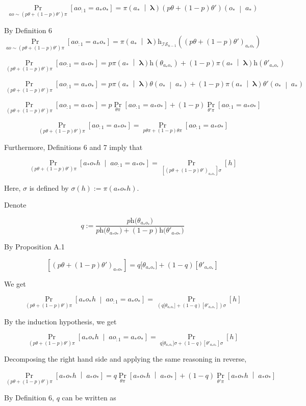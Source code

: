 \documentclass[a4paper]{article}
\newcommand{\AP}[1]{\left(#1\right)}
\newcommand{\AB}[1]{\left[#1\right]}
\newcommand{\APM}[2]{\left(#1\;\middle\vert\;#2\right)}
\newcommand{\ABM}[2]{\left[#1\;\middle\vert\;#2\right]}
\newcommand{\Pa}[2]{\underset{#1}{\operatorname{Pr}}\AB{#2}}
\newcommand{\CP}[3]{\underset{#1}{\operatorname{Pr}}\ABM{#2}{#3}}
\newcommand{\Estr}{\boldsymbol{\lambda}} %
\newcommand{\Ht}{\mathrm{h}}
\newcommand{\IS}{\mathcal{IS}}
\begin{document}
$$\Pa{ao\sim\AP{p\theta+(1-p)\theta'}\pi}{ao_{:1}=a_*o_*}=\pi\APM{a_*}{\Estr}\AP{p\theta+(1-p)\theta'}\APM{o_*}{ a_*}$$

By Definition 6
$$\Pa{ao\sim\AP{p\theta+(1-p)\theta'}\pi}{ao_{:1}=a_*o_*}=\pi\APM{a_*}{\Estr}\Ht_{\IS_{n-1}}\AP{\AP{p\theta+(1-p)\theta'}_{a_*o_*}}$$

$$\Pa{\AP{p\theta+(1-p)\theta'}\pi}{ao_{:1}=a_*o_*}=p\pi\APM{a_*}{\Estr}\Ht\AP{\theta_{a_*o_*}}+(1-p)\pi\APM{a_*}{\Estr}\Ht\AP{\theta'_{a_*o_*}}$$

$$\Pa{\AP{p\theta+(1-p)\theta'}\pi}{ao_{:1}=a_*o_*}=p\pi\APM{a_*}{\Estr}\theta\APM{o_*}{a_*}+(1-p)\pi\APM{a_*}{\Estr}\theta'\APM{o_*}{a_*}$$

$$\Pa{\AP{p\theta+(1-p)\theta'}\pi}{ao_{:1}=a_*o_*}=p\Pa{\theta\pi}{ao_{:1}=a_*o_*}+(1-p)\Pa{\theta'\pi}{ao_{:1}=a_*o_*}$$

$$\Pa{\AP{p\theta+(1-p)\theta'}\pi}{ao_{:1}=a_*o_*}=\Pa{p\theta\pi+(1-p)\theta\pi}{ao_{:1}=a_*o_*}$$

Furthermore, Definitions 6 and 7 imply that

$$\CP{\AP{p\theta+(1-p)\theta'}\pi}{a_*o_*h}{ao_{:1}=a_*o_*}=\Pa{\AB{\AP{p\theta+(1-p)\theta'}_{a_*o_*}}\sigma}{h}$$

Here, $\sigma$ is defined by $\sigma(h):=\pi\AP{a_*o_*h}$. 

Denote

$$q:=\frac{p\Ht\big(\theta_{a_*o_*}\big)}{p\Ht\big(\theta_{a_*o_*}\big)+(1-p)\Ht\big(\theta'_{a_*o_*}\big)}$$

By Proposition A.1

$$\AB{\AP{p\theta+(1-p)\theta'}_{a_*o_*}}=q\big[\theta_{a_*o_*}\big]+(1-q)\AB{\theta'_{a_*o_*}}$$


We get

$$\CP{\AP{p\theta+(1-p)\theta'}\pi}{a_*o_*h}{ao_{:1}=a_*o_*}=\Pa{\AP{q\big[\theta_{a_*o_*}\big]+(1-q)\AB{\theta'_{a_*o_*}}}\sigma}{h}$$

By the induction hypothesis, we get

$$\CP{\AP{p\theta+(1-p)\theta'}\pi}{a_*o_*h}{ao_{:1}=a_*o_*}=\Pa{q\big[\theta_{a_*o_*}\big]\sigma+(1-q)\AB{\theta'_{a_*o_*}}\sigma}{h}$$

Decomposing the right hand side and applying the same reasoning in reverse,

$$\CP{\AP{p\theta+(1-p)\theta'}\pi}{a_*o_*h}{a_*o_*}=q\CP{\theta\pi}{a_*o_*h}{a_*o_*}+(1-q)\CP{\theta'\pi}{a_*o_*h}{a_*o_*}$$

By Definition 6, $q$ can be written as
\end{document}
